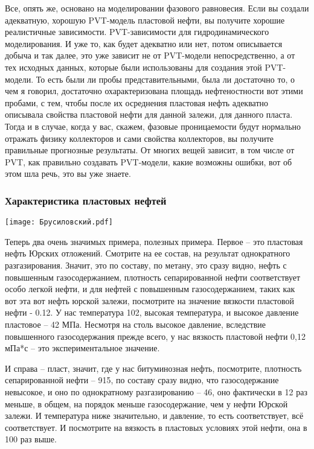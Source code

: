 \documentclass[main.tex]{subfiles}
\begin{document}
Все, опять же, основано на моделировании фазового равновесия.
Если вы создали адекватную, хорошую PVT-модель пластовой нефти, вы получите хорошие реалистичные зависимости.
PVT-зависимости для гидродинамического моделирования.
И уже то, как будет адекватно или нет, потом описывается добыча и так далее, это уже зависит не от PVT-модели непосредственно, а от тех исходных данных, которые были использованы для создания этой PVT-модели.
То есть были ли пробы представительными, была ли достаточно то, о чем я говорил,
достаточно охарактеризована площадь нефтеностности вот этими пробами, с тем, чтобы после их осреднения пластовая нефть адекватно описывала свойства пластовой нефти для данной залежи, для данного пласта.
Тогда и в случае, когда у вас, скажем, фазовые проницаемости будут нормально отражать физику коллекторов и сами свойства коллекторов, вы получите правильные прогнозные результаты.
От многих вещей зависит, в том числе от PVT, как правильно создавать PVT-модели,
какие возможны ошибки, вот об этом шла речь, это вы уже знаете.

\subsubsection{Характеристика пластовых нефтей}

\begin{center}
\texttt{[image: Брусиловский.pdf]}
\end{center}

Теперь два очень значимых примера, полезных примера.
Первое -- это пластовая нефть Юрских отложений.
Смотрите на ее состав, на результат однократного разгазирования.
Значит, это по составу, по метану, это сразу видно, нефть с повышенным газосодержанием, плотность сепарированной нефти соответствует особо легкой нефти, и для нефтей с повышенным газосодержанием, таких как вот эта вот нефть юрской залежи, посмотрите на значение вязкости пластовой нефти - 0.12.
У нас температура 102, высокая температура, и высокое давление пластовое -- 42 МПа.
Несмотря на столь высокое давление, вследствие повышенного газосодержания прежде всего, у нас вязкость пластовой нефти 0,12 мПа*с -- это экспериментальное значение.

И справа -- пласт, значит, где у нас битуминозная нефть, посмотрите, плотность сепарированной нефти -- 915, по составу сразу видно, что газосодержание невысокое, и оно по однократному разгазированию -- 46, оно фактически в 12 раз меньше, в общем, на порядок меньше газосодержание, чем у нефти Юрской залежи.
И температура ниже значительно, и давление, то есть соответствует, всё соответствует.
И посмотрите на вязкость в пластовых условиях этой нефти, она в 100 раз выше.
\end{document}
